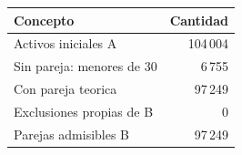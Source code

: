\begin{tabular}{@{}lr@{}}
\toprule
Concepto & Cantidad \\
\midrule
Activos iniciales A & 104\,004 \\
Sin pareja: menores de 30 & 6\,755 \\
Con pareja teorica & 97\,249 \\
Exclusiones propias de B & 0 \\
Parejas admisibles B & 97\,249 \\
\bottomrule
\end{tabular}
